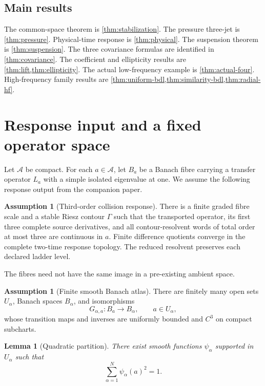 \documentclass[11pt,reqno]{amsart}
\newtheorem{lemma}[theorem]{Lemma}
\theoremstyle{definition}
\newtheorem{assumption}[theorem]{Assumption}
\theoremstyle{remark}
\newcommand{\A}{\mathcal A}
\begin{document}
\subsection*{Main results}
The common-space theorem is \cref{thm:stabilization}.  The pressure three-jet
is \cref{thm:pressure}.  Physical-time response is
\cref{thm:physical}.  The suspension theorem is \cref{thm:suspension}.  The
three covariance formulas are identified in \cref{thm:covariance}.  The
coefficient and ellipticity results are \cref{thm:lift,thm:ellipticity}.  The
actual low-frequency example is \cref{thm:actual-four}.  High-frequency family
results are \cref{thm:uniform-bdl,thm:similarity-bdl,thm:radial-hf}.

\section{Response input and a fixed operator space}\label{sec:common}

Let $\A$ be compact.  For each $a\in\A$, let $B_a$ be a Banach fibre carrying a
transfer operator $L_a$ with a simple isolated eigenvalue at one.  We assume the
following response output from the companion paper.

\begin{assumption}[Third-order collision response]\label{ass:response}
There is a finite graded fibre scale and a stable Riesz contour $\Gamma$ such
that the transported operator, its first three complete source derivatives,
and all contour-resolvent words of total order at most three are continuous in
$a$.  Finite difference quotients converge in the complete two-time response
topology.  The reduced resolvent preserves each declared ladder level.
\end{assumption}

The fibres need not have the same image in a pre-existing ambient space.

\begin{assumption}[Finite smooth Banach atlas]\label{ass:atlas}
There are finitely many open sets $U_\alpha$, Banach spaces $B_\alpha$, and
isomorphisms
\[
 G_{\alpha,a}:B_a\to B_\alpha,
 \qquad a\in U_\alpha,
\]
whose transition maps and inverses are uniformly bounded and $C^3$ on compact
subcharts.
\end{assumption}

\begin{lemma}[Quadratic partition]\label{lem:quadratic}
There exist smooth functions $\psi_\alpha$ supported in $U_\alpha$ such that
\begin{equation}\label{eq:quadratic}
 \sum_{\alpha=1}^N\psi_\alpha(a)^2=1.
\end{equation}
\end{lemma}
\end{document}
